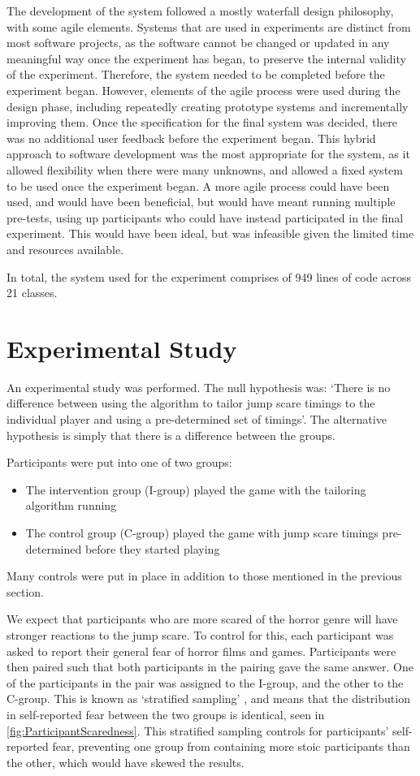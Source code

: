 \documentclass[12pt,a4paper]{article}\usepackage[]{graphicx}\usepackage[]{color}
\begin{document}
The development of the system followed a mostly waterfall design philosophy, with some agile elements.
Systems that are used in experiments are distinct from most software projects, as the software cannot be changed or updated in any meaningful way once the experiment has began, to preserve the internal validity of the experiment.
Therefore, the system needed to be completed before the experiment began.
However, elements of the agile process were used during the design phase, including repeatedly creating prototype systems and incrementally improving them.
Once the specification for the final system was decided, there was no additional user feedback before the experiment began.
This hybrid approach to software development was the most appropriate for the system, as it allowed flexibility when there were many unknowns, and allowed a fixed system to be used once the experiment began.
A more agile process could have been used, and would have been beneficial, but would have meant running multiple pre-tests, using up participants who could have instead participated in the final experiment.
This would have been ideal, but was infeasible given the limited time and resources available.

In total, the system used for the experiment comprises of 949 lines of code across 21 classes.

\section{Experimental Study}

An experimental study was performed.
The null hypothesis was: `There is no difference between using the algorithm to tailor jump scare timings to the individual player and using a pre-determined set of timings'.
The alternative hypothesis is simply that there is a difference between the groups.

Participants were put into one of two groups:
\begin{itemize}
	\item The intervention group (I-group) played the game with the tailoring algorithm running
	\item The control group (C-group) played the game with jump scare timings pre-determined before they started playing
\end{itemize}

Many controls were put in place in addition to those mentioned in the previous section.

We expect that participants who are more scared of the horror genre will have stronger reactions to the jump scare.
To control for this, each participant was asked to report their general fear of horror films and games.
Participants were then paired such that both participants in the pairing gave the same answer.
One of the participants in the pair was assigned to the I-group, and the other to the C-group.
This is known as `stratified sampling' \citep[p. 178]{stratification}, and means that the distribution in self-reported fear between the two groups is identical, seen in \vref{fig:ParticipantScaredness}.
This stratified sampling controls for participants' self-reported fear, preventing one group from containing more stoic participants than the other, which would have skewed the results.
\end{document}
